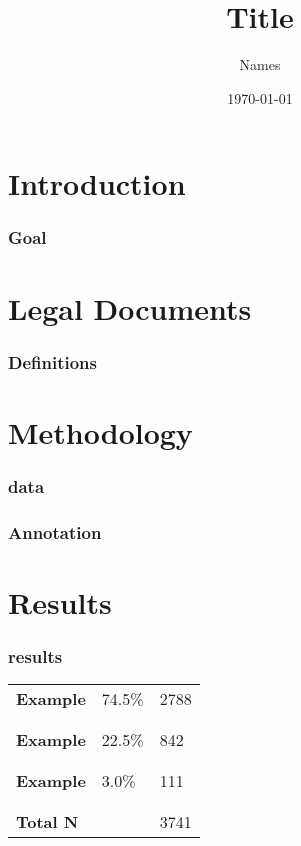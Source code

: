 \documentclass{beamer}
\begin{document}
\title{Title
}
\author{Names}
\date{\today}


\frame{\titlepage}

\section{Introduction}

\begin{frame}
\frametitle{Goal}

\end{frame}

\section{Legal Documents}
\begin{frame}
\frametitle{Definitions}

\end{frame}
\section{Methodology}

\begin{frame}
\frametitle{data}

\end{frame}

\begin{frame}
\frametitle{Annotation}

\end{frame}

\section{Results}


\begin{frame}
\frametitle{results}

\begin{center}


\vskip20pt
\begin{tabular}{l||l|l}


\textbf{Example} & \alert{74.5\%} \hskip20pt & 2788 \\
& &  \\
\hline
\hline
& & \\
\textbf{Example} & 22.5\% & 842\\
& & \\
\hline
\hline
& & \\
\textbf{Example} & 3.0\% &111\\
& & \\
\hline
& & \\
\textbf{Total N}  & & 3741\\
\end{tabular}
\end{center}
\end{frame}
\end{document}
